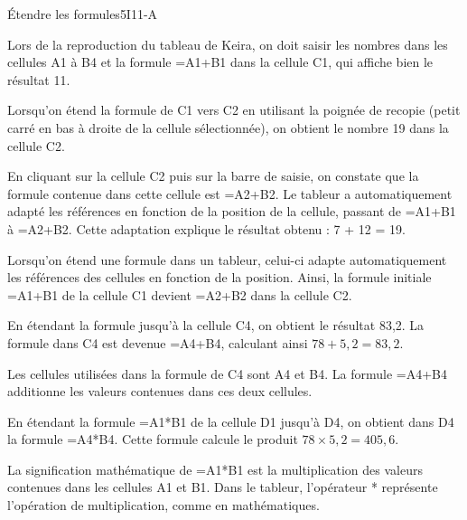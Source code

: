 \begin{EXO}{\'Etendre les formules}{5I11-A}
\begin{tcbenumerate}[1]
    \tcbitem Lors de la reproduction du tableau de Keira, on doit saisir les nombres dans les cellules A1 à B4 et la formule =A1+B1 dans la cellule C1, qui affiche bien le résultat 11.
    
    \tcbitem Lorsqu'on étend la formule de C1 vers C2 en utilisant la poignée de recopie (petit carré en bas à droite de la cellule sélectionnée), on obtient le nombre 19 dans la cellule C2.
    
    \tcbitem En cliquant sur la cellule C2 puis sur la barre de saisie, on constate que la formule contenue dans cette cellule est =A2+B2. Le tableur a automatiquement adapté les références en fonction de la position de la cellule, passant de =A1+B1 à =A2+B2. Cette adaptation explique le résultat obtenu : 7 + 12 = 19.
\end{tcbenumerate}


\begin{tcbenumerate}[1]
    \tcbitem Lorsqu'on étend une formule dans un tableur, celui-ci adapte automatiquement les références des cellules en fonction de la position. Ainsi, la formule initiale =A1+B1 de la cellule C1 devient =A2+B2 dans la cellule C2.
    
    \tcbitem En étendant la formule jusqu'à la cellule C4, on obtient le résultat 83,2. La formule dans C4 est devenue =A4+B4, calculant ainsi $78 + 5,2 = 83,2$.
    
    \tcbitem Les cellules utilisées dans la formule de C4 sont A4 et B4. La formule =A4+B4 additionne les valeurs contenues dans ces deux cellules.
    
    \tcbitem En étendant la formule =A1*B1 de la cellule D1 jusqu'à D4, on obtient dans D4 la formule =A4*B4.
    Cette formule calcule le produit $78 \times 5,2 = 405,6$.
    
    \tcbitem La signification mathématique de =A1*B1 est la multiplication des valeurs contenues dans les cellules A1 et B1. Dans le tableur, l'opérateur * représente l'opération de multiplication, comme en mathématiques.
\end{tcbenumerate}

\end{EXO}

